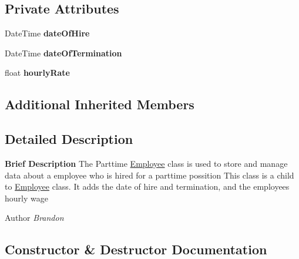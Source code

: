 \subsection*{Private Attributes}
\begin{DoxyCompactItemize}
\item 
\hypertarget{class_all_employees_1_1_parttime_employee_ae9217b6e9531dd5f6ac9029982bab405}{}Date\+Time {\bfseries date\+Of\+Hire}\label{class_all_employees_1_1_parttime_employee_ae9217b6e9531dd5f6ac9029982bab405}

\item 
\hypertarget{class_all_employees_1_1_parttime_employee_a98a60c754150cb7ff049b1a6f9eea5bc}{}Date\+Time {\bfseries date\+Of\+Termination}\label{class_all_employees_1_1_parttime_employee_a98a60c754150cb7ff049b1a6f9eea5bc}

\item 
\hypertarget{class_all_employees_1_1_parttime_employee_abbd98191b1a250e7910012c51f85bcea}{}float {\bfseries hourly\+Rate}\label{class_all_employees_1_1_parttime_employee_abbd98191b1a250e7910012c51f85bcea}

\end{DoxyCompactItemize}
\subsection*{Additional Inherited Members}


\subsection{Detailed Description}
{\bfseries Brief Description} The Parttime \hyperlink{class_all_employees_1_1_employee}{Employee} class is used to store and manage data about a employee who is hired for a parttime possition This class is a child to \hyperlink{class_all_employees_1_1_employee}{Employee} class. It adds the date of hire and termination, and the employees hourly wage 

\begin{DoxyAuthor}{Author}
{\itshape Brandon} 
\end{DoxyAuthor}


\subsection{Constructor \& Destructor Documentation}
\hypertarget{class_all_employees_1_1_parttime_employee_aefdb20ed1cc9fb007068380a97e3f51e}{}
